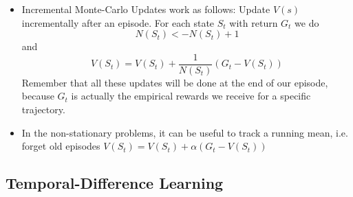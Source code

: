 \documentclass[a4paper]{article}
\begin{document}
\begin{itemize}
       \item Incremental Monte-Carlo Updates work as follows: Update $V(s)$ incrementally after an episode. For each state $S_t$ with return $G_t$ we do $$N(S_t) <- N(S_t) + 1$$ and $$V(S_t) = V(S_t) + \frac{1}{N(S_t)}(G_t - V(S_t))$$
       Remember that all these updates will be done at the end of our episode, because $G_t$ is actually the empirical rewards we receive for a specific trajectory. 
       \item In the non-stationary problems, it can be useful to track a running  mean, i.e. forget old episodes $V(S_t) = V(S_t) + \alpha(G_t-V(S_t))$
\end{itemize}
\subsection{Temporal-Difference Learning}
\end{document}
